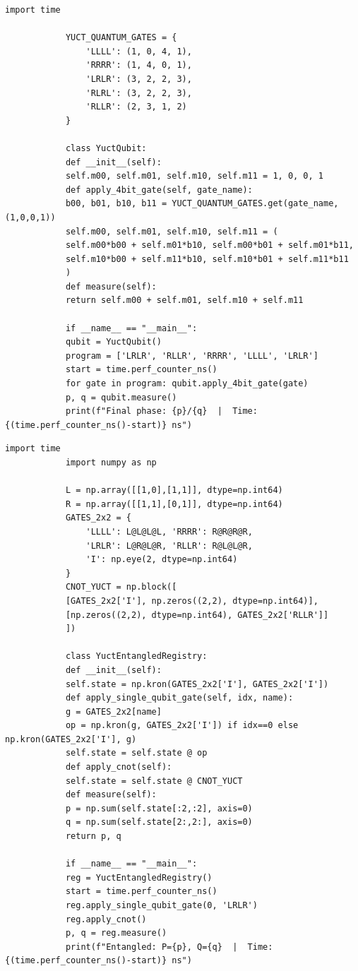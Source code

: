 \documentclass[12pt,a4paper]{article}
\begin{document}
	\begin{english}
		\begin{lstlisting}[caption={محاكي كيوبت واحد}]
			import time
			
			YUCT_QUANTUM_GATES = {
				'LLLL': (1, 0, 4, 1),
				'RRRR': (1, 4, 0, 1),
				'LRLR': (3, 2, 2, 3),
				'RLRL': (3, 2, 2, 3),
				'RLLR': (2, 3, 1, 2)
			}
			
			class YuctQubit:
			def __init__(self):
			self.m00, self.m01, self.m10, self.m11 = 1, 0, 0, 1
			def apply_4bit_gate(self, gate_name):
			b00, b01, b10, b11 = YUCT_QUANTUM_GATES.get(gate_name, (1,0,0,1))
			self.m00, self.m01, self.m10, self.m11 = (
			self.m00*b00 + self.m01*b10, self.m00*b01 + self.m01*b11,
			self.m10*b00 + self.m11*b10, self.m10*b01 + self.m11*b11
			)
			def measure(self):
			return self.m00 + self.m01, self.m10 + self.m11
			
			if __name__ == "__main__":
			qubit = YuctQubit()
			program = ['LRLR', 'RLLR', 'RRRR', 'LLLL', 'LRLR']
			start = time.perf_counter_ns()
			for gate in program: qubit.apply_4bit_gate(gate)
			p, q = qubit.measure()
			print(f"Final phase: {p}/{q}  |  Time: {(time.perf_counter_ns()-start)} ns")
		\end{lstlisting}
	\end{english}
	
	\begin{english}
		\begin{lstlisting}[caption={محاكي تشابك CNOT}]
			import time
			import numpy as np
			
			L = np.array([[1,0],[1,1]], dtype=np.int64)
			R = np.array([[1,1],[0,1]], dtype=np.int64)
			GATES_2x2 = {
				'LLLL': L@L@L@L, 'RRRR': R@R@R@R,
				'LRLR': L@R@L@R, 'RLLR': R@L@L@R,
				'I': np.eye(2, dtype=np.int64)
			}
			CNOT_YUCT = np.block([
			[GATES_2x2['I'], np.zeros((2,2), dtype=np.int64)],
			[np.zeros((2,2), dtype=np.int64), GATES_2x2['RLLR']]
			])
			
			class YuctEntangledRegistry:
			def __init__(self):
			self.state = np.kron(GATES_2x2['I'], GATES_2x2['I'])
			def apply_single_qubit_gate(self, idx, name):
			g = GATES_2x2[name]
			op = np.kron(g, GATES_2x2['I']) if idx==0 else np.kron(GATES_2x2['I'], g)
			self.state = self.state @ op
			def apply_cnot(self):
			self.state = self.state @ CNOT_YUCT
			def measure(self):
			p = np.sum(self.state[:2,:2], axis=0)
			q = np.sum(self.state[2:,2:], axis=0)
			return p, q
			
			if __name__ == "__main__":
			reg = YuctEntangledRegistry()
			start = time.perf_counter_ns()
			reg.apply_single_qubit_gate(0, 'LRLR')
			reg.apply_cnot()
			p, q = reg.measure()
			print(f"Entangled: P={p}, Q={q}  |  Time: {(time.perf_counter_ns()-start)} ns")
		\end{lstlisting}
	\end{english}
	
\end{document}
